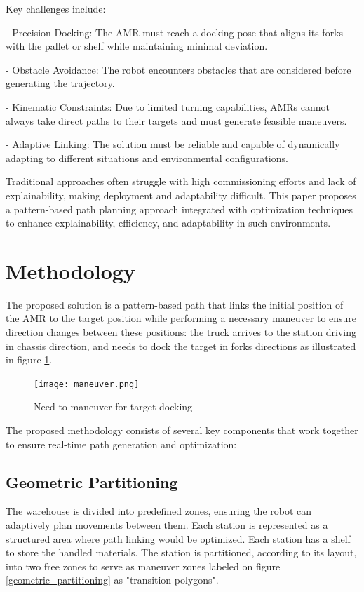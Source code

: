 \documentclass{amam}                %
\begin{document}
Key challenges include:

- Precision Docking: The AMR must reach a docking pose that aligns its forks with the pallet or shelf while maintaining minimal deviation.

- Obstacle Avoidance: The robot encounters obstacles that are considered before generating the trajectory.

- Kinematic Constraints: Due to limited turning capabilities, AMRs cannot always take direct paths to their targets and must generate feasible maneuvers.

- Adaptive Linking: The solution must be reliable and capable of dynamically adapting to different situations and environmental configurations.

Traditional approaches often struggle with high commissioning efforts and lack of explainability, making deployment and adaptability difficult. This paper proposes a pattern-based path planning approach integrated with optimization techniques to enhance explainability, efficiency, and adaptability in such environments.

\section{Methodology}
The proposed solution is a pattern-based path that links the initial position of the AMR to the target position while performing a necessary maneuver to ensure direction changes between these positions: the truck arrives to the station driving in chassis direction, and needs to dock the target in forks directions as illustrated in figure \ref{maneuver}.
\begin{figure}[t]
  \centering \texttt{[image: maneuver.png]}
  \caption{Need to maneuver for target docking}
  \label{maneuver}
\end{figure}

The proposed methodology consists of several key components that work together to ensure real-time path generation and optimization:
\subsection{Geometric Partitioning}
The warehouse is divided into predefined zones, ensuring the robot can adaptively plan movements between them. Each station is represented as a structured area where path linking would be optimized.
Each station has a shelf to store the handled materials. The station is partitioned, according to its layout,
into two free zones to serve as maneuver zones labeled on figure \ref{geometric_partitioning} as "transition polygons".
\end{document}
